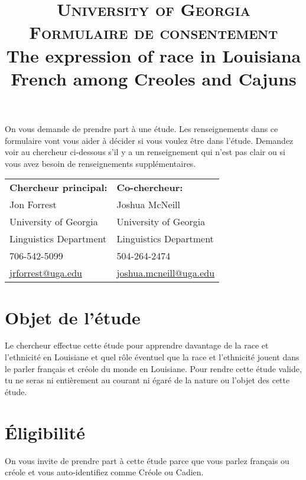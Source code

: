 \documentclass{article}
\title{\textsc{
           University of Georgia \\
           Formulaire de consentement \\
         }
         The expression of race in Louisiana French among Creoles and Cajuns}
\date{}
\newcommand{\tabhead}[1]{\textbf{#1}}
\begin{document}
    \maketitle
    On vous demande de prendre part à une étude.
    Les renseignements dans ce formulaire vont vous aider à décider si vous voulez être dans l'étude.
    Demandez voir au chercheur ci-dessous s'il y a un renseignement qui n'est pas clair ou si vous avez besoin de renseignements supplémentaires.
    \begin{center}
      \begin{tabular}{l l}
        \tabhead{Chercheur principal:}                     & \tabhead{Co-chercheur:} \\
        Jon Forrest                                        & Joshua McNeill \\
        University of Georgia                              & University of Georgia \\
        Linguistics Department                             & Linguistics Department \\
        706-542-5099                                       & 504-264-2474 \\
        \href{mailto:jrforrest@uga.edu}{jrforrest@uga.edu} & \href{mailto:joshua.mcneill@uga.edu}{joshua.mcneill@uga.edu}
      \end{tabular}
    \end{center}

    \section{Objet de l'étude}
      Le chercheur effectue cette étude pour apprendre davantage de la race et l'ethnicité en Louisiane et quel rôle éventuel que la race et l'ethnicité jouent dans le parler français et créole du monde en Louisiane.
      Pour rendre cette étude valide, tu ne seras ni entièrement au courant ni égaré de la nature ou l'objet des cette étude.

    \section{Éligibilité}
      On vous invite de prendre part à cette étude parce que vous parlez français ou créole et vous auto-identifiez comme Créole ou Cadien.
\end{document}
